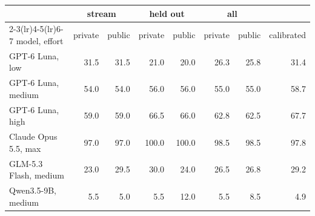 \begin{tabular}{lrrrrrrr}
\toprule
 & \multicolumn{2}{c}{stream} & \multicolumn{2}{c}{held out} & \multicolumn{2}{c}{all} & \\
\cmidrule(lr){2-3}\cmidrule(lr){4-5}\cmidrule(lr){6-7}
model, effort & private & public & private & public & private & public & calibrated \\
\midrule
GPT-6 Luna, low & 31.5 & 31.5 & 21.0 & 20.0 & 26.3 & 25.8 & 31.4 \\
GPT-6 Luna, medium & 54.0 & 54.0 & 56.0 & 56.0 & 55.0 & 55.0 & 58.7 \\
GPT-6 Luna, high & 59.0 & 59.0 & 66.5 & 66.0 & 62.8 & 62.5 & 67.7 \\
Claude Opus 5.5, max & 97.0 & 97.0 & 100.0 & 100.0 & 98.5 & 98.5 & 97.8 \\
GLM-5.3 Flash, medium & 23.0 & 29.5 & 30.0 & 24.0 & 26.5 & 26.8 & 29.2 \\
Qwen3.5-9B, medium & 5.5 & 5.0 & 5.5 & 12.0 & 5.5 & 8.5 & 4.9 \\
\bottomrule
\end{tabular}
